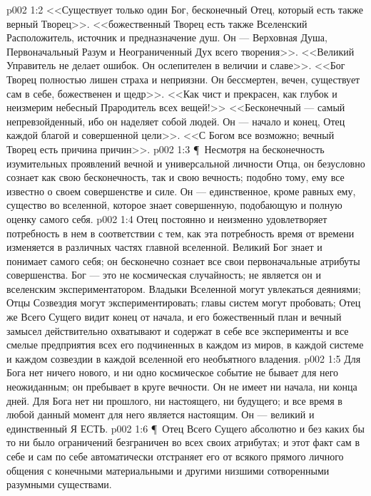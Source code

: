 \vs p002 1:2 <<Существует только один Бог, бесконечный Отец, который есть также верный Творец>>. <<божественный Творец есть также Вселенский Расположитель, источник и предназначение душ. Он --- Верховная Душа, Первоначальный Разум и Неограниченный Дух всего творения>>. <<Великий Управитель не делает ошибок. Он ослепителен в величии и славе>>. <<Бог Творец полностью лишен страха и неприязни. Он бессмертен, вечен, существует сам в себе, божественен и щедр>>. <<Как чист и прекрасен, как глубок и неизмерим небесный Прародитель всех вещей!>> <<Бесконечный --- самый непревзойденный, ибо он наделяет собой людей. Он --- начало и конец, Отец каждой благой и совершенной цели>>. <<С Богом все возможно; вечный Творец есть причина причин>>.
\vs p002 1:3 \P\ Несмотря на бесконечность изумительных проявлений вечной и универсальной личности Отца, он безусловно сознает как свою бесконечность, так и свою вечность; подобно тому, ему все известно о своем совершенстве и силе. Он --- единственное, кроме равных ему, существо во вселенной, которое знает совершенную, подобающую и полную оценку самого себя.
\vs p002 1:4 Отец постоянно и неизменно удовлетворяет потребность в нем в соответствии с тем, как эта потребность время от времени изменяется в различных частях главной вселенной. Великий Бог знает и понимает самого себя; он бесконечно сознает все свои первоначальные атрибуты совершенства. Бог --- это не космическая случайность; не является он и вселенским экспериментатором. Владыки Вселенной могут увлекаться деяниями; Отцы Созвездия могут экспериментировать; главы систем могут пробовать; Отец же Всего Сущего видит конец от начала, и его божественный план и вечный замысел действительно охватывают и содержат в себе все эксперименты и все смелые предприятия всех его подчиненных в каждом из миров, в каждой системе и каждом созвездии в каждой вселенной его необъятного владения.
\vs p002 1:5 Для Бога нет ничего нового, и ни одно космическое событие не бывает для него неожиданным; он пребывает в круге вечности. Он не имеет ни начала, ни конца дней. Для Бога нет ни прошлого, ни настоящего, ни будущего; и все время в любой данный момент для него является настоящим. Он --- великий и единственный Я ЕСТЬ.
\vs p002 1:6 \P\ Отец Всего Сущего абсолютно и без каких бы то ни было ограничений безграничен во всех своих атрибутах; и этот факт сам в себе и сам по себе автоматически отстраняет его от всякого прямого личного общения с конечными материальными и другими низшими сотворенными разумными существами.
